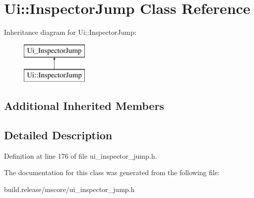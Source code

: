 \hypertarget{class_ui_1_1_inspector_jump}{}\section{Ui\+:\+:Inspector\+Jump Class Reference}
\label{class_ui_1_1_inspector_jump}
Inheritance diagram for Ui\+:\+:Inspector\+Jump\+:\begin{figure}[H]
\begin{center}
\leavevmode
\includegraphics[height=2.000000cm]{class_ui_1_1_inspector_jump}
\end{center}
\end{figure}
\subsection*{Additional Inherited Members}


\subsection{Detailed Description}


Definition at line 176 of file ui\+\_\+inspector\+\_\+jump.\+h.



The documentation for this class was generated from the following file\+:\begin{DoxyCompactItemize}
\item 
build.\+release/mscore/ui\+\_\+inspector\+\_\+jump.\+h\end{DoxyCompactItemize}
